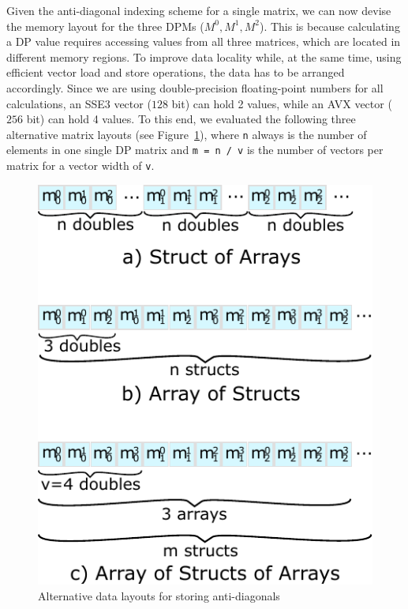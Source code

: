 \documentclass[runningheads,a4paper]{llncs}
\begin{document}
Given the anti-diagonal indexing scheme for a single matrix, we can now
devise the memory layout for the three DPMs ($M^0,M^1,M^2$).
This is because calculating a DP value requires
accessing values from all three matrices, which are located in different
memory regions.
To improve data locality while, at the same time, using efficient
vector load and store operations,
the data has to be arranged accordingly.  Since we are using
double-precision floating-point numbers for all calculations, an SSE3 vector
($128$ bit) can hold 2 values, while an AVX vector ($256$ bit) can hold 4 values.
To this end, we evaluated the following three alternative matrix layouts (see Figure~\ref{fig:datalayout}), 
where \verb|n| always is the number of elements in one single DP matrix and \verb|m = n / v| is the number of vectors per matrix for a vector width of \verb|v|.


\begin{figure}[ht!]
  \centering
  \includegraphics[scale=0.7]{figures/datalayout.pdf}
  \caption{Alternative data layouts for storing anti-diagonals}
  \label{fig:datalayout}
\end{figure}
\end{document}
